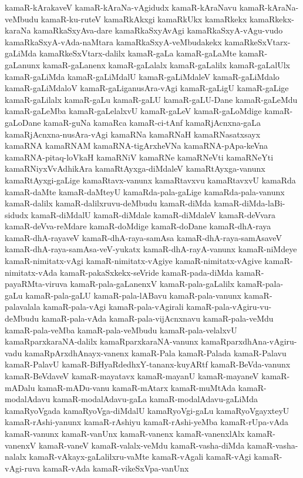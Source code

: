 {kamaR-kArakaveV
kamaR-kAraNa-vAgidudx
kamaR-kAraNavu
kamaR-kAraNa-veMbudu
kamaR-ku-ruteV
kamaRkAkxgi
kamaRkUkx
kamaRkekx
kamaRkekx-karaNa
kamaRkaSxyAva-dare
kamaRkaSxyAvAgi
kamaRkaSxyA-vAgu-vudo
kamaRkaSxyA-vAda-naMtara
kamaRkaSxyA-veMbudakekx
kamaRkeSxVtarx-gaLiMda
kamaRkeSxVtarx-dalilx
kamaR-gaLa
kamaR-gaLaMte
kamaR-gaLanunx
kamaR-gaLanenx
kamaR-gaLalalx
kamaR-gaLalilx
kamaR-gaLalUlx
kamaR-gaLiMda
kamaR-gaLiMdalU
kamaR-gaLiMdaleV
kamaR-gaLiMdalo
kamaR-gaLiMdaloV
kamaR-gaLiganusAra-vAgi
kamaR-gaLigU
kamaR-gaLige
kamaR-gaLilalx
kamaR-gaLu
kamaR-gaLU
kamaR-gaLU-Dane
kamaR-gaLeMdu
kamaR-gaLeMba
kamaR-gaLelalxvU
kamaR-gaLeV
kamaR-gaLoMdige
kamaR-gaLoDane
kamaR-guNa
kamaRca
kamaR-ci-tAnf
kamaRjAcnxna-gaLa
kamaRjAcnxna-nusAra-vAgi
kamaRNa
kamaRNaH
kamaRNasatxsayx
kamaRNA
kamaRNAM
kamaRNA-tigArxheVNa
kamaRNA-pApa-keVna
kamaRNA-pitaq-loVkaH
kamaRNiV
kamaRNe
kamaRNeVti
kamaRNeYti
kamaRNiyxVvAdhikAra
kamaRtAyxga-diMdaleV
kamaRtAyxga-vanunx
kamaRtAyxgi-gaLige
kamaRtavx-vanunx
kamaRtavxvu
kamaRtavxvU
kamaRda
kamaR-daMte
kamaR-daMteyU
kamaRda-pala-gaLige
kamaRda-pala-vanunx
kamaR-dalilx
kamaR-dalilxruvu-deMbudu
kamaR-diMda
kamaR-diMda-laBi-sidudx
kamaR-diMdalU
kamaR-diMdale
kamaR-diMdaleV
kamaR-deVvara
kamaR-deVva-reMdare
kamaR-doMdige
kamaR-doDane
kamaR-dhA-raya
kamaR-dhA-rayaveV
kamaR-dhA-raya-samAsa
kamaR-dhA-raya-samAsaveV
kamaR-dhA-raya-samAsa-veV-yukatx
kamaR-dhA-rayA-vanunx
kamaR-niMdeye
kamaR-nimitatx-vAgi
kamaR-nimitatx-vAgiye
kamaR-nimitatx-vAgive
kamaR-nimitatx-vAda
kamaR-pakaSxkekx-seVride
kamaR-pada-diMda
kamaR-payaRMta-viruva
kamaR-pala-gaLanenxV
kamaR-pala-gaLalilx
kamaR-pala-gaLu
kamaR-pala-gaLU
kamaR-pala-lABavu
kamaR-pala-vanunx
kamaR-palavalala
kamaR-pala-vAgi
kamaR-pala-vAgirali
kamaR-pala-vAgiru-vu-deMbudu
kamaR-pala-vAda
kamaR-pala-vijAcnxnavu
kamaR-pala-veMdu
kamaR-pala-veMba
kamaR-pala-veMbudu
kamaR-pala-velalxvU
kamaRparxkaraNA-dalilx
kamaRparxkaraNA-vanunx
kamaRparxdhAna-vAgiru-vadu
kamaRpArxdhAnayx-vanenx
kamaR-Pala
kamaR-Palada
kamaR-Palavu
kamaR-PalavU
kamaR-BiHyaRdedhxY-tananx-kuyARtf
kamaR-BeVda-vanunx
kamaR-BeVdaveV
kamaR-mayatavx
kamaR-mayanU
kamaR-mayaneV
kamaR-mADalu
kamaR-mADu-vanu
kamaR-mAtarx
kamaR-muMtAda
kamaR-modalAdavu
kamaR-modalAdavu-gaLa
kamaR-modalAdavu-gaLiMda
kamaRyoVgada
kamaRyoVga-diMdalU
kamaRyoVgi-gaLu
kamaRyoVgayxteyU
kamaR-rAshi-yanunx
kamaR-rAshiyu
kamaR-rAshi-yeMba
kamaR-rUpa-vAda
kamaR-vanunx
kamaR-vanUnx
kamaR-vanenx
kamaR-vanenxlAlx
kamaR-vanenxV
kamaR-vaneV
kamaR-valalx-veMdu
kamaR-vasha-diMda
kamaR-vasha-nalalx
kamaR-vAkayx-gaLalilxru-vaMte
kamaR-vAgali
kamaR-vAgi
kamaR-vAgi-ruva
kamaR-vAda
kamaR-vikeSxVpa-vanUnx
}
